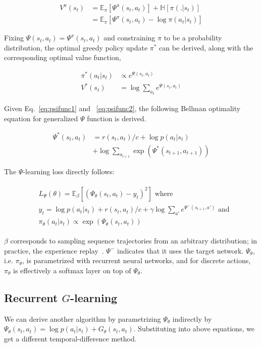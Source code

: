 \begin{align} 
\label{eq:psivalue}
V^\pi(s_t) &= \mathbb{E}_{\pi}[\Psi^\pi(s_t,a_t)] + \mathbb{H}[\pi(.|s_t)]\\
&= \mathbb{E}_{\pi}[\Psi^\pi(s_t,a_t) - \log \pi(a_t|s_t)] 
\end{align}

Fixing $\Psi(s_t,a_t)=\Psi^\pi(s_t,a_t)$ and constraining $\pi$ to be a probability distribution, the optimal greedy policy update $\pi^*$ can be derived, along with the corresponding optimal value function,

\begin{align} 
\pi^*(a_t|s_t) &\propto e^{\Psi(s_t,a_t)} \\
\label{eq:psifunc2}
V^*(s_t) &= \log \sum_{a_t} e^{\Psi(s_t,a_t)}
\end{align}

Given Eq.~\ref{eq:psifunc1} and ~\ref{eq:psifunc2}, the following Bellman optimality equation for generalized $\Psi$ function is derived.

\begin{align} 
\label{eq:psibell}
\Psi^*(s_t,a_t) &= r(s_t,a_t)/c +\log p(a_t|s_t)\nonumber\\
&+ \log \sum_{a_{t+1}} \exp(\Psi^*(s_{t+1},a_{t+1}))
\end{align}

The $\Psi$-learning loss directly follows:

\begin{align}
\begin{split}
\label{eq:psi_loss}
&L_{\Psi}(\theta)= \mathbb{E}_\beta[( \Psi_\theta(s_t,a_t)-y_t)^2] \textrm{ where}\\
&y_t = \log p(a_t|s_t) + r(s_t,a_t)/c + \gamma \log \sum_{a'} e^{\Psi^-(s_{t+1}, a')} \textrm{ and}\\
&\pi_\theta(a_t|s_t) \propto \exp(\Psi_\theta(s_t,a_t)) 
\end{split}
\end{align}

$\beta$ corresponds to sampling sequence trajectories from an arbitrary distribution; in practice, the experience replay~\citep{dqn}. $\Psi^-$ indicates that it uses the target network. $\Psi_\theta$, i.e. $\pi_\theta$, is parametrized with recurrent neural networks, and for discrete actions, $\pi_\theta$ is effectively a softmax layer on top of $\Psi_\theta$.  

\subsection{Recurrent $G$-learning} We can derive another algorithm by parametrizing $\Psi_\theta$ indirectly by $\Psi_\theta(s_t,a_t)=\log p(a_t|s_t)+ G_\theta(s_t,a_t)$. Substituting into above equations, we get a different temporal-difference method.

